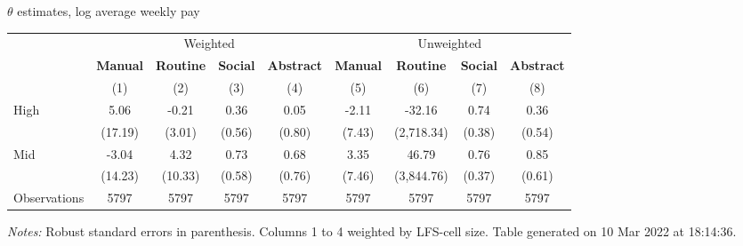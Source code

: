 \begin{center}
\begin{threeparttable}[!h]
\caption{$ \theta $ estimates, log average weekly pay}
\begin{tabular}{lcccccccc}
\toprule
\toprule
& \multicolumn{4}{c}{Weighted} & \multicolumn{4}{c}{Unweighted} \\
&\multicolumn{1}{c}{\textbf{Manual}}&\multicolumn{1}{c}{\textbf{Routine}}&\multicolumn{1}{c}{\textbf{Social}}&\multicolumn{1}{c}{\textbf{Abstract}}&\multicolumn{1}{c}{\textbf{Manual}}&\multicolumn{1}{c}{\textbf{Routine}}&\multicolumn{1}{c}{\textbf{Social}}&\multicolumn{1}{c}{\textbf{Abstract}} \\
\textbf{}&\multicolumn{1}{c}{(1)}&\multicolumn{1}{c}{(2)}&\multicolumn{1}{c}{(3)}&\multicolumn{1}{c}{(4)}&\multicolumn{1}{c}{(5)}&\multicolumn{1}{c}{(6)}&\multicolumn{1}{c}{(7)}&\multicolumn{1}{c}{(8)} \\
\midrule
High                &        5.06&       -0.21&        0.36&        0.05&       -2.11&      -32.16&        0.74&        0.36\\
                    &     (17.19)&      (3.01)&      (0.56)&      (0.80)&      (7.43)&  (2,718.34)&      (0.38)&      (0.54)\\
Mid                 &       -3.04&        4.32&        0.73&        0.68&        3.35&       46.79&        0.76&        0.85\\
                    &     (14.23)&     (10.33)&      (0.58)&      (0.76)&      (7.46)&  (3,844.76)&      (0.37)&      (0.61)\\
Observations        &        5797&        5797&        5797&        5797&        5797&        5797&        5797&        5797\\
\bottomrule
\bottomrule
\end{tabular}
\begin{tablenotes}
\item \footnotesize \textit{Notes:} Robust standard errors in parenthesis. Columns 1 to 4 weighted by LFS-cell size. Table generated on 10 Mar 2022 at 18:14:36.
\end{tablenotes}
\end{threeparttable}
\end{center}
